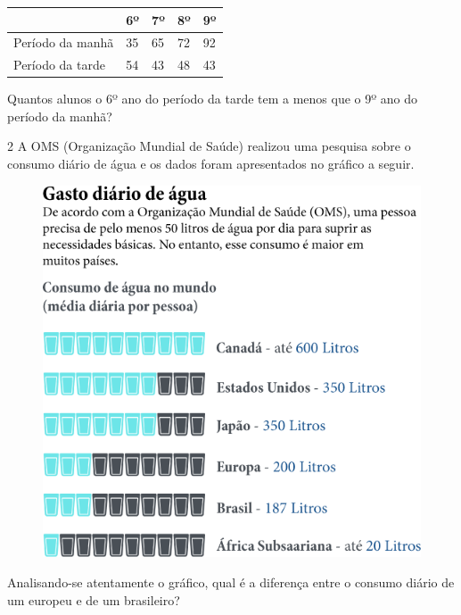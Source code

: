 \begin{longtable}[]{@{}lllll@{}}
\toprule
& 6º & 7º & 8º & 9º\tabularnewline
\midrule
\endhead
Período da manhã & 35 & 65 & 72 & 92\tabularnewline
Período da tarde & 54 & 43 & 48 & 43\tabularnewline
\bottomrule
\end{longtable}

\pagebreak
Quantos alunos o 6º ano do período da tarde tem a menos que o 9º
ano do período da manhã?

\begin{mdframed}[linewidth=2pt,linecolor=salmao,roundcorner=2pt]
\vspace{2cm}
\end{mdframed}

\num{2} A OMS (Organização Mundial de Saúde) realizou uma pesquisa sobre o
consumo diário de água e os dados foram apresentados no gráfico a seguir.

\begin{figure}[htpb!]
\centering
\includegraphics[width=.9\textwidth]{media/image42.png}
\end{figure}

\pagebreak
Analisando-se atentamente o gráfico, qual é a diferença entre o
consumo diário de um europeu e de um brasileiro?

\begin{mdframed}[linewidth=2pt,linecolor=salmao,roundcorner=2pt]
\vspace{2cm}
\end{mdframed}

